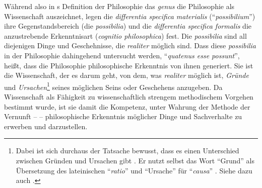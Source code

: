 Während also in
s Definition
der Philosophie das \emph{genus} die Philosophie als Wissenschaft auszeichnet,
legen die \emph{differentia specifica materialis} (\enquote{\emph{possibilium}})
ihre Gegenstandsbereich (die \emph{possibilia}) und die \emph{differentia
specifica formalis} die anzustrebende Erkenntnisart (\emph{cognitio
philosophica}) fest. Die \emph{possibilia} sind all diejenigen Dinge und
Geschehnisse, die \emph{realiter} möglich sind. Dass diese \emph{possibilia} in
der Philosophie dahingehend untersucht werden, \enquote{\emph{quatenus esse
possunt}}, heißt, dass die Philosophie philosophische Erkenntnis von ihnen
generiert. Sie ist die Wissenschaft, der es darum geht, von dem, was
\emph{realiter} möglich ist, \emph{Gründe} und \emph{Ursachen}\footnote{Dabei
ist sich 
durchaus der Tatsache bewusst, dass es einen Unterschied zwischen Gründen und
Ursachen gibt \parencite[vgl.][\S~71]{Wolff:Philosophiaprimasiveontologia1977}. Er nutzt
selbst das Wort \enquote{Grund} als Übersetzung des lateinischen
\enquote{\emph{ratio}} und \enquote{Ursache} für \enquote{\emph{causa}}
\parencite[vgl.][\S~13]{Wolff:VernuenftigeGedanckenvonGottderWeltundderSeeledesMenschenauchallenDingenueberhauptDeutscheMetaphysik1983}.
Siehe dazu auch
\cite[][\S~74]{Stiebritz:ErlaeuterungderWolffschenVernuenfftigenGedanckenvonGottderWeltundderSeeledesMenschenauchallenDingenueberhaupt1999}.}
seines möglichen Seins oder Geschehens anzugeben. Da Wissenschaft als Fähigkeit
zu wissenschaftlich strengem methodischem Vorgehen bestimmt wurde, ist sie damit
die Kompetenz, unter Wahrung der Methode der Vernunft --  -- philosophische Erkenntnis möglicher Dinge und Sachverhalte zu
erwerben und darzustellen.


